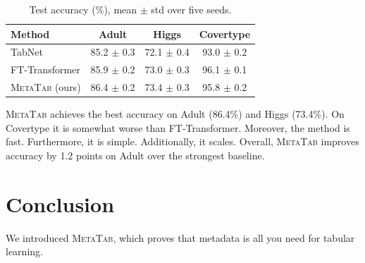 \begin{table}[t]
  \centering
  \caption{Test accuracy (\%), mean $\pm$ std over five seeds.}
  \label{tab:main}
  \begin{tabular}{lccc}
    \toprule
    Method & Adult & Higgs & Covertype \\
    \midrule
    TabNet \citep{arik2021tabnet} & 85.2 $\pm$ 0.3 & 72.1 $\pm$ 0.4 & 93.0 $\pm$ 0.2 \\
    FT-Transformer \citep{gorishniy2021revisiting} & 85.9 $\pm$ 0.2 & 73.0 $\pm$ 0.3 & 96.1 $\pm$ 0.1 \\
    \textsc{MetaTab} (ours) & 86.4 $\pm$ 0.2 & 73.4 $\pm$ 0.3 & 95.8 $\pm$ 0.2 \\
    \bottomrule
  \end{tabular}
\end{table}

\textsc{MetaTab} achieves the best accuracy on Adult (86.4\%) and Higgs (73.4\%). On Covertype it is somewhat worse than FT-Transformer. Moreover, the method is fast. Furthermore, it is simple. Additionally, it scales. Overall, \textsc{MetaTab} improves accuracy by 1.2 points on Adult over the strongest baseline.

\section{Conclusion}

We introduced \textsc{MetaTab}, which proves that metadata is all you need for tabular learning.
